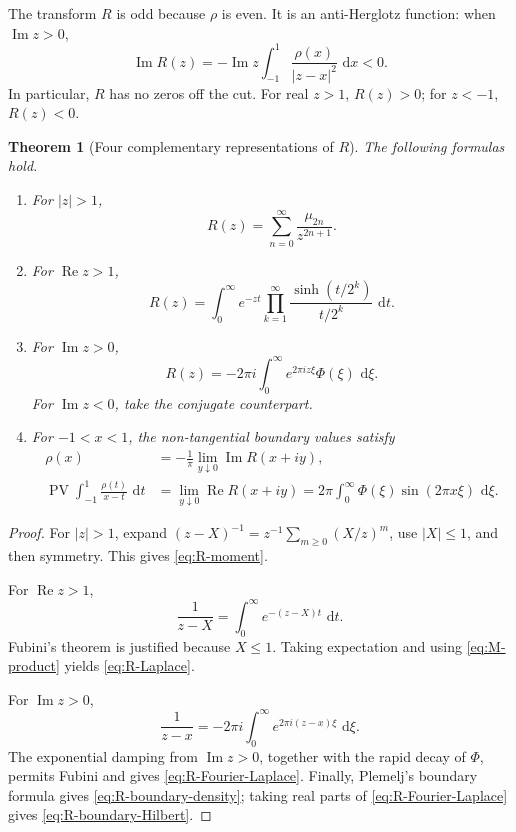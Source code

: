 \documentclass[11pt]{article}
\newtheorem{theorem}{Theorem}[section]
\theoremstyle{definition}
\theoremstyle{remark}
\newcommand{\dd}{\,\mathrm d}
\newcommand{\PV}{\operatorname{PV}}
\begin{document}
The transform \(R\) is odd because \(\rho\) is even.  It is an anti-Herglotz function:
when \(\operatorname{Im}z>0\),
\begin{equation}
 \operatorname{Im}R(z)
 =-\operatorname{Im}z\int_{-1}^{1}\frac{\rho(x)}{|z-x|^2}\,\dd x<0. \label{eq:R-anti-Herglotz}
\end{equation}
In particular, \(R\) has no zeros off the cut.  For real \(z>1\), \(R(z)>0\); for
\(z<-1\), \(R(z)<0\).

\begin{theorem}[Four complementary representations of \(R\)]\label{thm:R-representations}
The following formulas hold.

\begin{enumerate}[label=(\roman*)]
\item For \(|z|>1\),
\begin{equation}
 R(z)=\sum_{n=0}^{\infty}\frac{\mu_{2n}}{z^{2n+1}}.          \label{eq:R-moment}
\end{equation}
\item For \(\operatorname{Re}z>1\),
\begin{equation}
 R(z)=\int_0^{\infty}e^{-zt}
 \prod_{k=1}^{\infty}\frac{\sinh(t/2^k)}{t/2^k}\,\dd t.    \label{eq:R-Laplace}
\end{equation}
\item For \(\operatorname{Im}z>0\),
\begin{equation}
 R(z)=-2\pi i\int_0^{\infty}e^{2\pi i z\xi}\Phi(\xi)\,\dd\xi. \label{eq:R-Fourier-Laplace}
\end{equation}
For \(\operatorname{Im}z<0\), take the conjugate counterpart.
\item For \(-1<x<1\), the non-tangential boundary values satisfy
\begin{align}
 \rho(x)&=-\frac1\pi\lim_{y\downarrow0}\operatorname{Im}R(x+iy),
                                                               \label{eq:R-boundary-density}\\
 \PV\int_{-1}^{1}\frac{\rho(t)}{x-t}\,\dd t
 &=\lim_{y\downarrow0}\operatorname{Re}R(x+iy)
 =2\pi\int_0^{\infty}\Phi(\xi)\sin(2\pi x\xi)\,\dd\xi.     \label{eq:R-boundary-Hilbert}
\end{align}
\end{enumerate}
\end{theorem}

\begin{proof}
For \(|z|>1\), expand \((z-X)^{-1}=z^{-1}\sum_{m\ge0}(X/z)^m\), use
\(|X|\le1\), and then symmetry.  This gives \eqref{eq:R-moment}.

For \(\operatorname{Re}z>1\),
\[
 \frac1{z-X}=\int_0^{\infty}e^{-(z-X)t}\,\dd t.
\]
Fubini's theorem is justified because \(X\le1\).  Taking expectation and using
\eqref{eq:M-product} yields \eqref{eq:R-Laplace}.

For \(\operatorname{Im}z>0\),
\[
 \frac1{z-x}=-2\pi i\int_0^{\infty}e^{2\pi i(z-x)\xi}\,\dd\xi.
\]
The exponential damping from \(\operatorname{Im}z>0\), together with the rapid decay of
\(\Phi\), permits Fubini and gives \eqref{eq:R-Fourier-Laplace}.  Finally,
Plemelj's boundary formula gives \eqref{eq:R-boundary-density}; taking real parts of
\eqref{eq:R-Fourier-Laplace} gives \eqref{eq:R-boundary-Hilbert}.
\end{proof}
\end{document}
